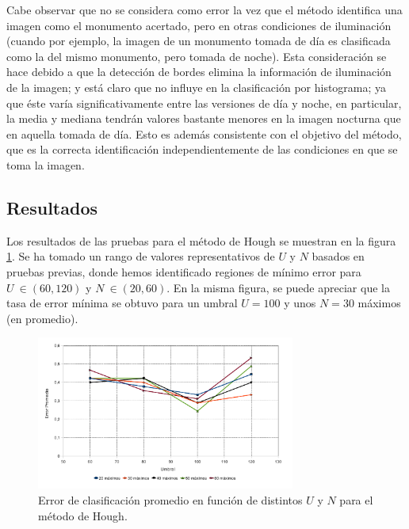 \documentclass[conference,spanish,a4paper,10pt,oneside,final]{tfmpd}
\begin{document}
Cabe observar que no se considera como error la vez que el método identifica
una imagen como el monumento acertado, pero en otras
condiciones de iluminación (cuando por ejemplo, la imagen de un monumento
tomada de día es clasificada como la del mismo monumento, pero tomada de noche).
Esta consideración se hace debido a que la detección de bordes elimina la
información de iluminación de la imagen; y está claro que no influye
en la clasificación por histograma; ya que éste varía significativamente
entre las versiones de día y noche, en particular, la media y mediana tendrán
valores bastante menores en la imagen nocturna que en aquella tomada de día.
Esto es además consistente con el objetivo del método, que es la correcta
identificación independientemente de las condiciones en que se toma la imagen.
%
%
\subsection{Resultados}

Los resultados de las pruebas para el método de Hough se muestran en la figura
\ref{graficaerror}. Se ha tomado un rango de valores representativos de $U$
y $N$ basados en pruebas previas, donde hemos identificado regiones de mínimo
error para $U~\in(60,120)$ y $N~\in(20,60)$.
En la misma figura, se puede apreciar que la tasa de error mínima se obtuvo
para un umbral $U = 100$ y unos $N = 30$ máximos (en promedio).

\begin{figure}
\begin{center}
\includegraphics[width=8.5cm]{../diagramas/estadistica_noche_iguales} 
\end{center}
\caption{Error de clasificación promedio en función de distintos $U$ y $N$ para
el método de Hough.}
\label{graficaerror}
\end{figure}

%
\end{document}

